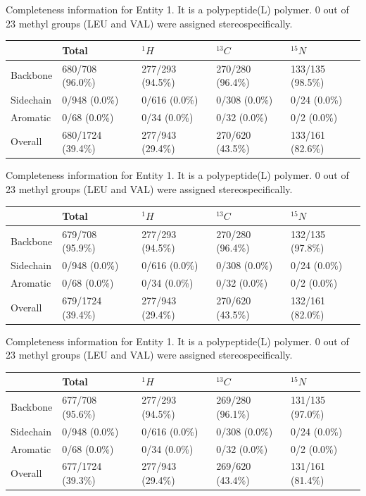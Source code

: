 Completeness information for Entity 1. It is a polypeptide(L) polymer. 0 out of 23 methyl groups (LEU and VAL) were assigned stereospecifically.\begin{longtable}{|l|l|l|l|l|}
\hline
  & Total & $^{1}H$ & $^{13}C$ & $^{15}N$\\\hline
Backbone & 680/708 (96.0\%)& 277/293 (94.5\%)& 270/280 (96.4\%)& 133/135 (98.5\%) \\
\hline
Sidechain & 0/948 (0.0\%)& 0/616 (0.0\%)& 0/308 (0.0\%)& 0/24 (0.0\%) \\
\hline
Aromatic & 0/68 (0.0\%)& 0/34 (0.0\%)& 0/32 (0.0\%)& 0/2 (0.0\%) \\
\hline
Overall & 680/1724 (39.4\%)& 277/943 (29.4\%)& 270/620 (43.5\%)& 133/161 (82.6\%) \\
\hline
\end{longtable}
Completeness information for Entity 1. It is a polypeptide(L) polymer. 0 out of 23 methyl groups (LEU and VAL) were assigned stereospecifically.\begin{longtable}{|l|l|l|l|l|}
\hline
  & Total & $^{1}H$ & $^{13}C$ & $^{15}N$\\\hline
Backbone & 679/708 (95.9\%)& 277/293 (94.5\%)& 270/280 (96.4\%)& 132/135 (97.8\%) \\
\hline
Sidechain & 0/948 (0.0\%)& 0/616 (0.0\%)& 0/308 (0.0\%)& 0/24 (0.0\%) \\
\hline
Aromatic & 0/68 (0.0\%)& 0/34 (0.0\%)& 0/32 (0.0\%)& 0/2 (0.0\%) \\
\hline
Overall & 679/1724 (39.4\%)& 277/943 (29.4\%)& 270/620 (43.5\%)& 132/161 (82.0\%) \\
\hline
\end{longtable}
Completeness information for Entity 1. It is a polypeptide(L) polymer. 0 out of 23 methyl groups (LEU and VAL) were assigned stereospecifically.\begin{longtable}{|l|l|l|l|l|}
\hline
  & Total & $^{1}H$ & $^{13}C$ & $^{15}N$\\\hline
Backbone & 677/708 (95.6\%)& 277/293 (94.5\%)& 269/280 (96.1\%)& 131/135 (97.0\%) \\
\hline
Sidechain & 0/948 (0.0\%)& 0/616 (0.0\%)& 0/308 (0.0\%)& 0/24 (0.0\%) \\
\hline
Aromatic & 0/68 (0.0\%)& 0/34 (0.0\%)& 0/32 (0.0\%)& 0/2 (0.0\%) \\
\hline
Overall & 677/1724 (39.3\%)& 277/943 (29.4\%)& 269/620 (43.4\%)& 131/161 (81.4\%) \\
\hline
\end{longtable}
